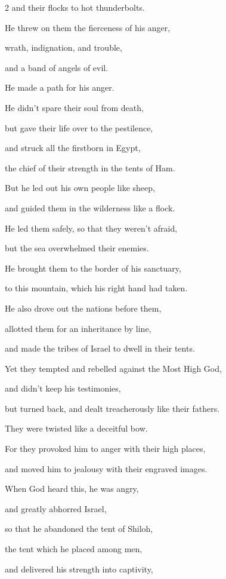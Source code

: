 \begin{multicols}{2}
	and their flocks to hot thunderbolts.
	
	
	\myverse{}He threw on them the fierceness of his anger,
	
	wrath, indignation, and trouble,
	
	and a band of angels of evil.
	
	
	\myverse{}He made a path for his anger.
	
	He didn’t spare their soul from death,
	
	but gave their life over to the pestilence,
	
	
	\myverse{}and struck all the firstborn in Egypt,
	
	the chief of their strength in the tents of Ham.
	
	
	\myverse{}But he led out his own people like sheep,
	
	and guided them in the wilderness like a flock.
	
	
	\myverse{}He led them safely, so that they weren’t afraid,
	
	but the sea overwhelmed their enemies.
	
	
	\myverse{}He brought them to the border of his sanctuary,
	
	to this mountain, which his right hand had taken.
	
	
	\myverse{}He also drove out the nations before them,
	
	allotted them for an inheritance by line,
	
	and made the tribes of Israel to dwell in their tents.
	
	
	\myverse{}Yet they tempted and rebelled against the Most High God,
	
	and didn’t keep his testimonies,
	
	
	\myverse{}but turned back, and dealt treacherously like their fathers.
	
	They were twisted like a deceitful bow.
	
	
	\myverse{}For they provoked him to anger with their high places,
	
	and moved him to jealousy with their engraved images.
	
	
	\myverse{}When God heard this, he was angry,
	
	and greatly abhorred Israel,
	
	
	\myverse{}so that he abandoned the tent of Shiloh,
	
	the tent which he placed among men,
	
	
	\myverse{}and delivered his strength into captivity,
	

\end{multicols}
